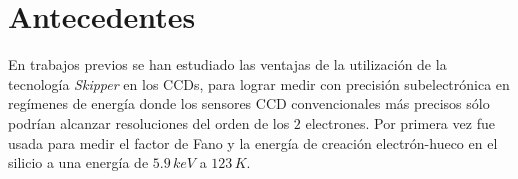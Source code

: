 
\section{Antecedentes \label{sec:Antecedentes}}
\noindent En trabajos previos se han estudiado las ventajas de la utilización de la tecnología \textit{Skipper} en los CCDs, para lograr medir con precisión subelectrónica en regímenes de energía donde los sensores CCD convencionales más precisos sólo podrían alcanzar resoluciones del orden de los $2$ electrones. Por primera vez fue usada para medir el factor de Fano y la energía de creación electrón-hueco en el silicio a una energía de $5.9\,\si{keV}$ a $123\,\si{K}$\cite{Rodrigues}.

